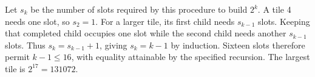Let $s_k$ be the number of slots required by this procedure to build $2^k$. A tile 4 needs one slot, so $s_2=1$. For a larger tile, its first child needs $s_{k-1}$ slots. Keeping that completed child occupies one slot while the second child needs another $s_{k-1}$ slots. Thus $s_k=s_{k-1}+1$, giving $s_k=k-1$ by induction. Sixteen slots therefore permit $k-1\le16$, with equality attainable by the specified recursion. The largest tile is $\boxed{2^{17}=131072}$.
